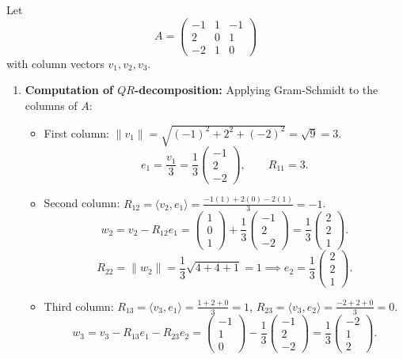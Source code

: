\begin{exercisesolution*}
\label{sol:qr_decomposition_computation}
Let
\[
A = \begin{pmatrix} -1 & 1 & -1 \\ 2 & 0 & 1 \\ -2 & 1 & 0 \end{pmatrix}
\]
with column vectors $v_1, v_2, v_3$.
\begin{enumerate}[label=\textbf{(\alph*)}]
    \item \textbf{Computation of $QR$-decomposition:}
    Applying Gram-Schmidt to the columns of $A$:
    \begin{itemize}
        \item First column: $\|v_1\| = \sqrt{(-1)^2 + 2^2 + (-2)^2} = \sqrt{9} = 3$.
        \[
        e_1 = \frac{v_1}{3} = \frac{1}{3}\begin{pmatrix} -1 \\ 2 \\ -2 \end{pmatrix}, \qquad R_{11} = 3.
        \]
        \item Second column: $R_{12} = \langle v_2, e_1 \rangle = \frac{-1(1) + 2(0) - 2(1)}{3} = -1$.
        \[
        w_2 = v_2 - R_{12} e_1 = \begin{pmatrix} 1 \\ 0 \\ 1 \end{pmatrix} + \frac{1}{3}\begin{pmatrix} -1 \\ 2 \\ -2 \end{pmatrix} = \frac{1}{3}\begin{pmatrix} 2 \\ 2 \\ 1 \end{pmatrix}.
        \]
        \[
        R_{22} = \|w_2\| = \frac{1}{3}\sqrt{4 + 4 + 1} = 1 \implies e_2 = \frac{1}{3}\begin{pmatrix} 2 \\ 2 \\ 1 \end{pmatrix}.
        \]
        \item Third column: $R_{13} = \langle v_3, e_1 \rangle = \frac{1 + 2 + 0}{3} = 1$, $R_{23} = \langle v_3, e_2 \rangle = \frac{-2 + 2 + 0}{3} = 0$.
        \[
        w_3 = v_3 - R_{13} e_1 - R_{23} e_2 = \begin{pmatrix} -1 \\ 1 \\ 0 \end{pmatrix} - \frac{1}{3}\begin{pmatrix} -1 \\ 2 \\ -2 \end{pmatrix} = \frac{1}{3}\begin{pmatrix} -2 \\ 1 \\ 2 \end{pmatrix}.
\]
\end{itemize}
\end{enumerate}
\end{exercisesolution*}
